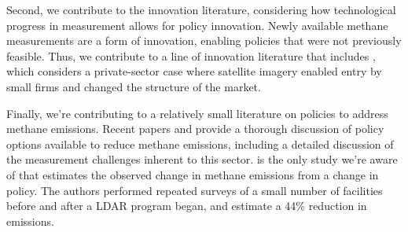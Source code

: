 Second, we contribute to the innovation literature, considering how technological progress in measurement allows for policy innovation.
Newly available methane measurements are a form of innovation, enabling policies that were not previously feasible.
Thus, we contribute to a line of innovation literature that includes \textcite{Nagaraj:2020}, which considers a private-sector case where satellite imagery enabled entry by small firms and changed the structure of the market.

Finally, we're contributing to a relatively small literature on policies to address methane emissions.
Recent papers
\textcite{Mohlin/Lackner/Nguyen/Wolfe:2022} and
\textcite{Dobson/Goodday/Winter:2023}
provide a thorough discussion of policy options available to reduce methane emissions, including a detailed discussion of the measurement challenges inherent to this sector.
\textcite{Ravikumar/etal:2020} is the only study we're aware of that estimates the observed change in methane emissions from a change in policy.
The authors performed repeated surveys of a small number of facilities before and after a \gls{LDAR} program began, and estimate a 44\% reduction in emissions.

